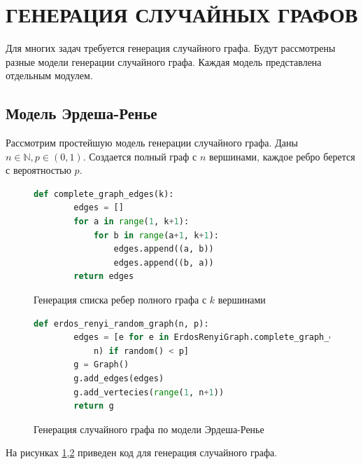 \section{ГЕНЕРАЦИЯ СЛУЧАЙНЫХ ГРАФОВ}
Для многих задач требуется генерация 
случайного графа. Будут рассмотрены 
разные модели генерации случайного графа. Каждая 
модель представлена отдельным модулем.
\subsection{Модель Эрдеша-Ренье}
Рассмотрим простейшую модель генерации случайного графа. 
Даны $n \in \mathbb{N}, p \in (0,1)$. Создается 
полный граф с $n$ вершинами, каждое
ребро берется с вероятностью  $p$.

\begin{figure}[H] 
\begin{lstlisting}[language=Python] 
    def complete_graph_edges(k):
        edges = []
        for a in range(1, k+1):
            for b in range(a+1, k+1):
                edges.append((a, b))
                edges.append((b, a))
        return edges
\end{lstlisting}  
\caption{Генерация списка ребер полного графа с
$k$ вершинами}
\label{erd_1}
\end{figure}
\begin{figure}[H] 
\begin{lstlisting}[language=Python] 
    def erdos_renyi_random_graph(n, p):
        edges = [e for e in ErdosRenyiGraph.complete_graph_edges(
            n) if random() < p]
        g = Graph()
        g.add_edges(edges)
        g.add_vertecies(range(1, n+1))
        return g
\end{lstlisting}  
\caption{Генерация случайного графа по модели Эрдеша-Ренье }
\label{erd_2}
\end{figure} 
На рисунках \ref{erd_1},\ref{erd_2}
приведен код для генерация случайного графа.
